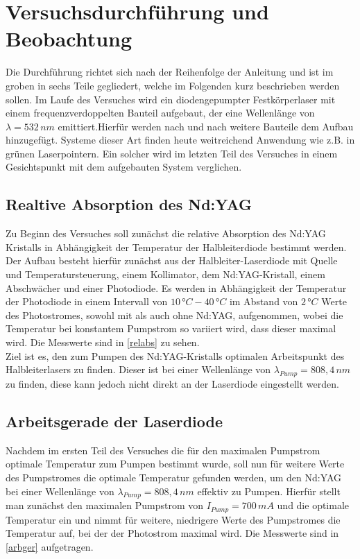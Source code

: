 \documentclass[twoside,colorback,accentcolor=tud4c,11pt]{tudreport}
\begin{document}
\chapter{Versuchsdurchführung und Beobachtung}
Die Durchführung richtet sich nach der Reihenfolge der Anleitung und ist im groben in sechs Teile gegliedert, welche im Folgenden kurz beschrieben werden sollen. Im Laufe des Versuches wird ein diodengepumpter Festkörperlaser mit einem frequenzverdoppelten Bauteil aufgebaut, der eine Wellenlänge von $\lambda =532\,\si{nm}$ emittiert.Hierfür werden nach und nach weitere Bauteile dem Aufbau hinzugefügt. Systeme dieser Art finden heute weitreichend Anwendung wie z.B. in grünen Laserpointern. Ein solcher wird im letzten Teil des Versuches in einem Gesichtspunkt mit dem aufgebauten System verglichen.
\section{Realtive Absorption des Nd:YAG}\label{v1}
Zu Beginn des Versuches soll zunächst die relative Absorption des Nd:YAG Kristalls in Abhängigkeit der Temperatur der Halbleiterdiode bestimmt werden. Der Aufbau besteht hierfür zunächst aus der Halbleiter-Laserdiode mit Quelle und Temperatursteuerung, einem Kollimator, dem Nd:YAG-Kristall, einem Abschwächer und einer Photodiode. Es werden in Abhängigkeit der Temperatur der Photodiode in einem Intervall von $10\,\si{°C}-40\,\si{°C}$ im Abstand von $2\,\si{°C}$ Werte des Photostromes, sowohl mit als auch ohne Nd:YAG, aufgenommen, wobei die Temperatur bei konstantem Pumpstrom so variiert wird, dass dieser maximal wird. Die Messwerte sind in \ref{relabs} zu sehen.\\
Ziel ist es, den zum Pumpen des Nd:YAG-Kristalls optimalen Arbeitspunkt des Halbleiterlasers zu finden. Dieser ist bei einer Wellenlänge von $\lambda_{Pump}=808,4\,\si{nm}$ zu finden, diese kann jedoch nicht direkt an der Laserdiode eingestellt werden.
\section{Arbeitsgerade der Laserdiode}\label{v2}
Nachdem im ersten Teil des Versuches die für den maximalen Pumpstrom optimale Temperatur zum Pumpen bestimmt wurde, soll nun für weitere Werte des Pumpstromes die optimale Temperatur gefunden werden, um den Nd:YAG bei einer Wellenlänge von $\lambda_{Pump}=808,4\,\si{nm}$ effektiv zu Pumpen. Hierfür stellt man zunächst den maximalen Pumpstrom von $I_{Pump}=700\,\si{mA}$ und die optimale Temperatur ein und nimmt für weitere, niedrigere Werte des Pumpstromes die Temperatur auf, bei der der Photostrom maximal wird. Die Messwerte sind in \ref{arbger} aufgetragen.
\end{document}
